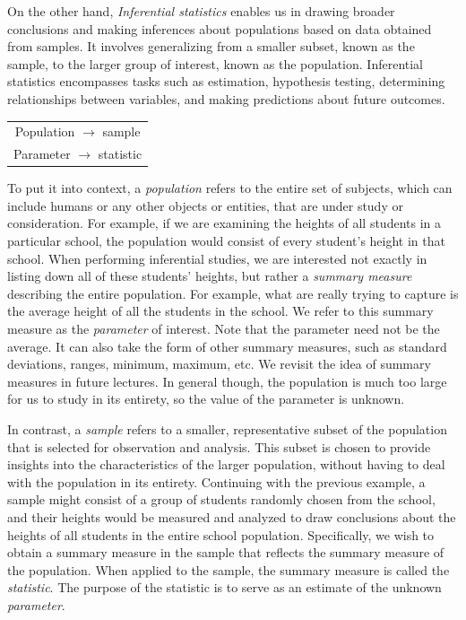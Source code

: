 \documentclass{article}
\begin{document}
On the other hand, \emph{Inferential statistics} enables us in drawing broader conclusions and making inferences about populations based on data obtained from samples. It involves generalizing from a smaller subset, known as the sample, to the larger group of interest, known as the population. Inferential statistics encompasses tasks such as estimation, hypothesis testing, determining relationships between variables, and making predictions about future outcomes.

\begin{margintable}
\begin{tabular}{c} 
    Population $\to$ sample \\
    Parameter $\to$ statistic
\end{tabular}
\end{margintable}

To put it into context, a \emph{population} refers to the entire set of subjects, which can include humans or any other objects or entities, that are under study or consideration. For example, if we are examining the heights of all students in a particular school, the population would consist of every student's height in that school. When performing inferential studies, we are interested not exactly in listing down all of these students' heights, but rather a \emph{summary measure} describing the entire population. For example, what are really trying to capture is the average height of all the students in the school. We refer to this summary measure as the \emph{parameter} of interest. Note that the parameter need not be the average. It can also take the form of other summary measures, such as standard deviations, ranges, minimum, maximum, etc. We revisit the idea of summary measures in future lectures. In general though, the population is much too large for us to study in its entirety, so the value of the parameter is unknown.

In contrast, a \emph{sample} refers to a smaller, representative subset of the population that is selected for observation and analysis. This subset is chosen to provide insights into the characteristics of the larger population, without having to deal with the population in its entirety. Continuing with the previous example, a sample might consist of a group of students randomly chosen from the school, and their heights would be measured and analyzed to draw conclusions about the heights of all students in the entire school population. Specifically, we wish to obtain a summary measure in the sample that reflects the summary measure of the population. When applied to the sample, the summary measure is called the \emph{statistic}. The purpose of the statistic is to serve as an estimate of the unknown \emph{parameter}.
\end{document}
